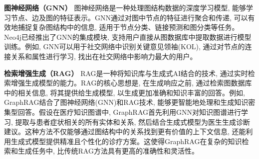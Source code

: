 \textbf{图神经网络（GNN）}
图神经网络是一种处理图结构数据的深度学习模型, 能够学习节点、边及图的特征表示。GNN通过对图中节点的特征进行聚合和传递, 可以有效地捕捉复杂图结构中的信息, 适用于节点分类、链接预测和图分类等任务\cite{wu2020gnn}。Neo4j已经推出了GNN的集成模块, 支持用户直接从图数据库中提取数据进行模型训练。例如, GNN可以用于社交网络中识别关键意见领袖(KOL), 通过对节点的连接关系和属性进行学习, 找出在社交网络中影响力最大的用户。


\textbf{检索增强生成（RAG）}
RAG是一种将知识库与生成式AI结合的技术, 通过实时检索增强生成模型的能力。RAG的核心思想是, 在生成响应之前, 通过检索图数据库中的相关信息, 将其提供给生成模型, 以生成更加准确和知识丰富的回答。例如, GraphRAG结合了图神经网络(GNN)和RAG技术, 能够更智能地处理和生成知识密集型回答。假设在医疗知识图谱中, GraphRAG首先利用GNN对知识图谱进行学习, 提取与患者症状相关的所有实体和关系, 然后结合生成式模型为医生生成诊断建议。这种方法不仅能够通过图结构中的关系找到更有价值的上下文信息, 还能利用生成式模型提供精准且个性化的诊疗方案。这使得GraphRAG在复杂的知识检索和生成任务中, 比传统RAG方法具有更高的准确性和灵活性\cite{jiang2024reasoningenhancedhealthcarepredictionsknowledge}。


